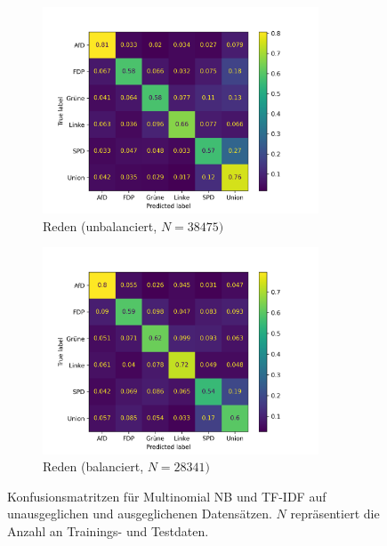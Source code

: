 \begin{figure}[H]
    \begin{subfigure}{0.5\textwidth}
      \centering
      \includegraphics[width=0.9\textwidth]{data/images/modeling/baseline/none/speeches_confusion_matrix.png}
      \caption{Reden (unbalanciert, \(N=\num{38475})\)} \label{sfig:confusionMatrixBaselineSpeeches}
    \end{subfigure}
    \begin{subfigure}{0.5\textwidth}
      \centering
      \includegraphics[width=0.9\textwidth]{data/images/modeling/baseline/under/speeches_confusion_matrix.png}
      \caption{Reden (balanciert, \(N=\num{28341})\)} \label{sfig:confusionMatrixBaselineSpeechesBalanced}
    \end{subfigure}
    
    \caption[Konfusionsmatritzen für Multinomial \acs{NB} und \acs{TF-IDF} auf unausgeglichen und ausgeglichenen Datensätzen]{Konfusionsmatritzen für Multinomial \acs{NB} und \acs{TF-IDF} auf unausgeglichen und ausgeglichenen Datensätzen. $N$ repräsentiert die Anzahl an Trainings- und Testdaten.} \label{fig:confusionMatrixBaseline}
\end{figure}

